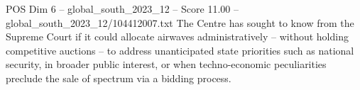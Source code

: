 \begin{textsample}{POS Dim 6 – global\_south\_2023\_12 – Score 11.00 – global\_south\_2023\_12/104412007.txt}
The Centre has sought to know from the Supreme Court if it could allocate airwaves administratively -- without holding competitive auctions -- to address unanticipated state priorities such as national security, in broader public interest, or when techno-economic peculiarities preclude the sale of spectrum via a bidding process.

\end{textsample}
